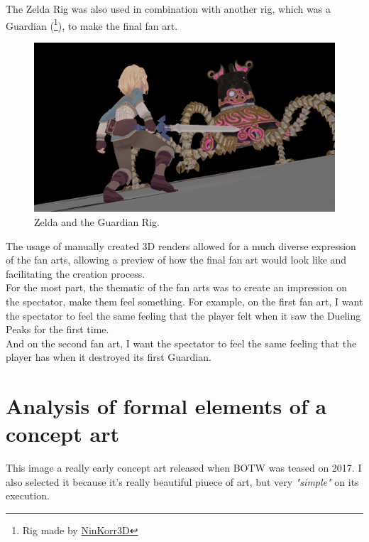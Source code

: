 \documentclass{cup-pan}
\begin{document}
    The Zelda Rig was also used in combination with another rig, which was a Guardian 
    (\footnote{Rig made by 
        \href{https://sketchfab.com/3d-models/guardian-zelda-botw-fan-art-990a6a9434c849329360ea1ef9078895}{NinKorr3D}}), to make the final fan art.
    \begin{figure}[H]
        \includegraphics[width=\textwidth]{Imagenes/Referencias/referencia art 2.png}
        \caption{Zelda and the Guardian Rig.}
    \end{figure}

    The usage of manually created 3D renders allowed for a much diverse expression of the fan arts, allowing a preview of how the final fan art would look like and facilitating the creation process.\\

    For the most part, the thematic of the fan arts was to create an impression on the spectator, make them feel something. For example, on the first fan art, I want the spectator to feel the same feeling that the player felt when it saw the Dueling Peaks for the first time. \\

    And on the second fan art, I want the spectator to feel the same feeling that the player has when it destroyed its first Guardian.

\newpage

\section{Analysis of formal elements of a concept art}

    This image a really early concept art released when BOTW was teased on 2017. I also selected it because it's really beautiful piuece of art, but very \textit{"simple"} on its execution. 
    
\end{document}

